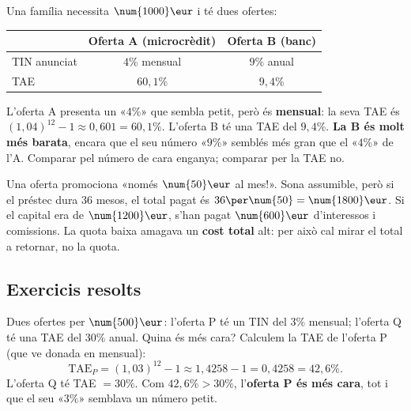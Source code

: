 \begin{exemple}
Una família necessita $\num{1000}\eur$ i té dues ofertes:
\begin{center}
\renewcommand{\arraystretch}{1.3}
\begin{tabular}{l c c}
\toprule
 & \textbf{Oferta A (microcrèdit)} & \textbf{Oferta B (banc)} \\
\midrule
TIN anunciat & $4\%$ mensual & $9\%$ anual \\
TAE & $60,1\%$ & $9,4\%$ \\
\bottomrule
\end{tabular}
\end{center}
L'oferta A presenta un «$4\%$» que sembla petit, però és \textbf{mensual}: la seva TAE
és $(1,04)^{12}-1\approx 0,601=60,1\%$. L'oferta B té una TAE del $9,4\%$. \textbf{La
B és molt més barata}, encara que el seu número «$9\%$» semblés més gran que el «$4\%$»
de l'A. Comparar pel número de cara enganya; comparar per la TAE no.
\end{exemple}

\begin{exemple}
Una oferta promociona «només $\num{50}\eur$ al mes!». Sona assumible, però si el
préstec dura $36$ mesos, el total pagat és $36\per\num{50}=\num{1800}\eur$. Si el
capital era de $\num{1200}\eur$, s'han pagat $\num{600}\eur$ d'interessos i comissions.
La quota baixa amagava un \textbf{cost total} alt: per això cal mirar el total a
retornar, no la quota.
\end{exemple}

\subsection{Exercicis resolts}

\begin{exresolt}
Dues ofertes per $\num{500}\eur$: l'oferta P té un TIN del $3\%$ mensual; l'oferta Q
té una TAE del $30\%$ anual. Quina és més cara?
\solucio
Calculem la TAE de l'oferta P (que ve donada en mensual):
\[
\text{TAE}_P=(1,03)^{12}-1\approx 1,4258-1=0,4258=42,6\%.
\]
L'oferta Q té TAE $=30\%$. Com $42,6\%>30\%$, l'\textbf{oferta P és més cara}, tot i
que el seu «$3\%$» semblava un número petit.
\end{exresolt}

